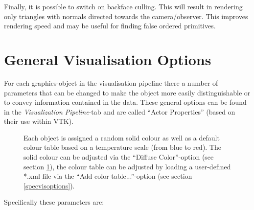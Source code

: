 Finally, it is possible to switch on backface culling. This will result in rendering only triangles with normals directed towards the camera/observer. This improves rendering speed and may be useful for finding false ordered primitives.

\section{General Visualisation Options}
\label{genvisoptions}

For each graphics-object in the visualisation pipeline there a number of parameters that can be changed to make the object more easily distinguishable or to convey information contained in the data. These general options can be found in the \emph{Visualization Pipeline}-tab and are called ``Actor Properties'' (based on their use within VTK).

\begin{figure}[tb]
\begin{center}
 \enspace
{}\enspace
{}
\end{center}
\caption{Each object is assigned a random solid colour as well as a default colour table based on a temperature scale (from blue to red). The solid colour can be adjusted via the ``Diffuse Color''-option (see section \ref{genvisoptions}), the colour table can be adjusted by loading a user-defined *.xml file via the ``Add color table...''-option (see section \ref{specvisoptions}).} \label{fig:colours}
\end{figure}

Specifically these parameters are:

